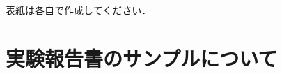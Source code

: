\documentclass[a4j]{jreport}
\begin{document}

%
%
\begin{titlepage}
  \centering		%
  \vfill
  \vspace*{10cm}
  表紙は各自で作成してください．
  \vspace*{10cm}
  \vfill
\end{titlepage}


\chapter*{実験報告書のサンプルについて}
%
%
%
\end{document}
